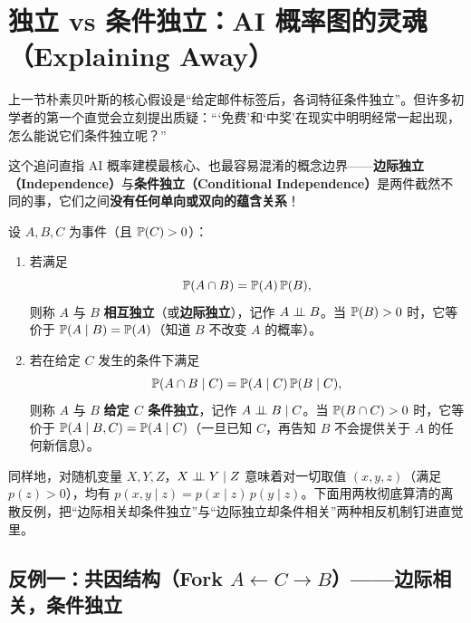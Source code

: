 \section{独立 vs 条件独立：AI 概率图的灵魂（Explaining Away）}
\label{sec:ch1-indep-condindep}

上一节朴素贝叶斯的核心假设是“给定邮件标签后，各词特征条件独立”。但许多初学者的第一个直觉会立刻提出质疑：“‘免费’和‘中奖’在现实中明明经常一起出现，怎么能说它们条件独立呢？”

这个追问直指 AI 概率建模最核心、也最容易混淆的概念边界——\textbf{边际独立（Independence）}与\textbf{条件独立（Conditional Independence）}是两件截然不同的事，它们之间\textbf{没有任何单向或双向的蕴含关系}！

\begin{defBox}
\begin{definition}[独立性与条件独立性]
\label{def:ch1-indep}
设 $A, B, C$ 为事件（且 $\mathbb{P}(C) > 0$）：
\begin{enumerate}
  \item 若满足
  \begin{equation}
    \mathbb{P}(A \cap B) = \mathbb{P}(A)\,\mathbb{P}(B), \label{eq:ch1-indep}
  \end{equation}
  则称 $A$ 与 $B$ \textbf{相互独立}（或\textbf{边际独立}），记作 $A \perp\!\!\!\perp B$。当 $\mathbb{P}(B)>0$ 时，它等价于 $\mathbb{P}(A \mid B) = \mathbb{P}(A)$（知道 $B$ 不改变 $A$ 的概率）。
  \item 若在给定 $C$ 发生的条件下满足
  \begin{equation}
    \mathbb{P}(A \cap B \mid C) = \mathbb{P}(A \mid C)\,\mathbb{P}(B \mid C), \label{eq:ch1-cond-indep}
  \end{equation}
  则称 $A$ 与 $B$ \textbf{给定 $C$ 条件独立}，记作 $A \perp\!\!\!\perp B \mid C$。当 $\mathbb{P}(B \cap C)>0$ 时，它等价于 $\mathbb{P}(A \mid B, C) = \mathbb{P}(A \mid C)$（一旦已知 $C$，再告知 $B$ 不会提供关于 $A$ 的任何新信息）。
\end{enumerate}
\end{definition}
\end{defBox}

同样地，对随机变量 $X, Y, Z$，$X \perp\!\!\!\perp Y \mid Z$ 意味着对一切取值 $(x, y, z)$（满足 $p(z)>0$），均有 $p(x, y \mid z) = p(x \mid z)\,p(y \mid z)$。下面用两枚彻底算清的离散反例，把“边际相关却条件独立”与“边际独立却条件相关”两种相反机制钉进直觉里。

\subsection{反例一：共因结构（Fork $A \leftarrow C \rightarrow B$）——边际相关，条件独立}


